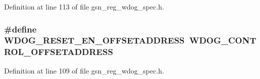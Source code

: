 Definition at line 113 of file gsn\_\-reg\_\-wdog\_\-spec.h.

\hypertarget{a00577_ac800dfa9691b917382d38775182c8ba7}{
\subsubsection[{WDOG\_\-RESET\_\-EN\_\-OFFSETADDRESS}]{\setlength{\rightskip}{0pt plus 5cm}\#define WDOG\_\-RESET\_\-EN\_\-OFFSETADDRESS~WDOG\_\-CONTROL\_\-OFFSETADDRESS}}
\label{a00577_ac800dfa9691b917382d38775182c8ba7}


Definition at line 109 of file gsn\_\-reg\_\-wdog\_\-spec.h.

